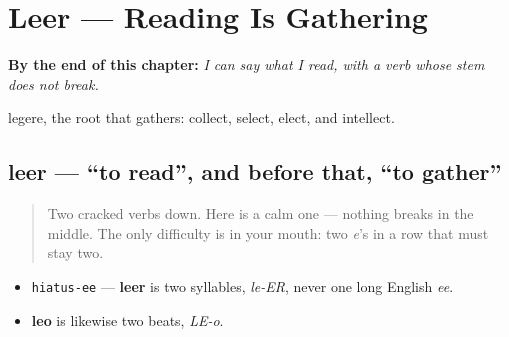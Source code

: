 
\chapter{Leer — Reading Is Gathering}
\label{ch:spanish-leer}

\begin{chapteropening}
\textbf{By the end of this chapter:} \emph{I can say what I read, with a verb whose stem does not break.}

legere, the root that gathers: collect, select, elect, and intellect.
\end{chapteropening}

\section[leer]{leer — \textquotedblleft{}to read\textquotedblright{}, and before that, \textquotedblleft{}to gather\textquotedblright{}}

\label{lesson:ES-C34-leer}



\begin{quote}
Two cracked verbs down. Here is a calm one — nothing breaks in the middle. The only difficulty is in your mouth: two \emph{e}'s in a row that must stay two.
\end{quote}

\begin{sounds}
\begin{itemize}
\raggedright
  \item \texttt{hiatus-ee} — \textbf{leer} is two syllables, \emph{le-ER}, never one long English \emph{ee}.
  \item \textbf{leo} is likewise two beats, \emph{LE-o}.
\end{itemize}
\end{sounds}

